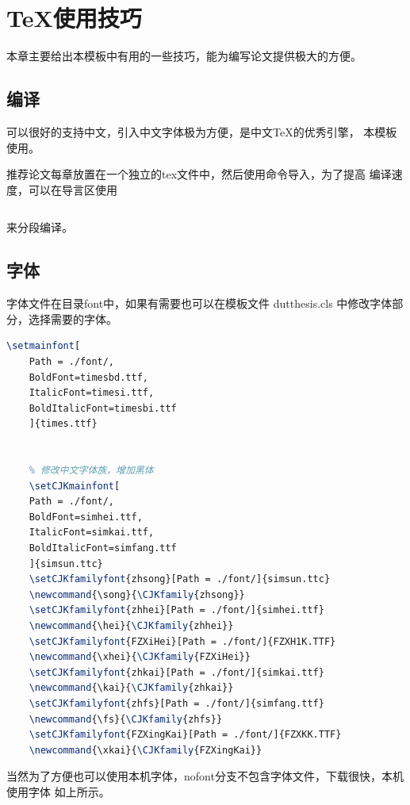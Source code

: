 \chapter{\TeX 使用技巧}
\begin{Sketch}
    本章主要给出本模板中有用的一些技巧，能为编写论文提供极大的方便。
\end{Sketch}
\section{编译}
\label{sec:compile}
    \XeLaTeX 可以很好的支持中文，引入中文字体极为方便，是中文\TeX 的优秀引擎，
    本模板使用\XeLaTeX 。

推荐论文每章放置在一个独立的tex文件中，然后使用\verb||命令导入，为了提高
编译速度，可以在导言区使用 
\begin{lstlisting}

\end{lstlisting}
来分段编译。

\section{字体}
\label{sec:font}
    字体文件在目录font中，如果有需要也可以在模板文件
    dutthesis.cls 中修改字体部分，选择需要的字体。
    \begin{lstlisting}[language=TeX]
	\setmainfont[
	Path = ./font/,
	BoldFont=timesbd.ttf,
	ItalicFont=timesi.ttf,
	BoldItalicFont=timesbi.ttf
	]{times.ttf}


	% 修改中文字体族，增加黑体
	\setCJKmainfont[
	Path = ./font/,
	BoldFont=simhei.ttf,
	ItalicFont=simkai.ttf,
	BoldItalicFont=simfang.ttf
	]{simsun.ttc}
	\setCJKfamilyfont{zhsong}[Path = ./font/]{simsun.ttc}
	\newcommand{\song}{\CJKfamily{zhsong}}
	\setCJKfamilyfont{zhhei}[Path = ./font/]{simhei.ttf}
	\newcommand{\hei}{\CJKfamily{zhhei}}
	\setCJKfamilyfont{FZXiHei}[Path = ./font/]{FZXH1K.TTF}
	\newcommand{\xhei}{\CJKfamily{FZXiHei}}
	\setCJKfamilyfont{zhkai}[Path = ./font/]{simkai.ttf}
	\newcommand{\kai}{\CJKfamily{zhkai}}
	\setCJKfamilyfont{zhfs}[Path = ./font/]{simfang.ttf}
	\newcommand{\fs}{\CJKfamily{zhfs}}
	\setCJKfamilyfont{FZXingKai}[Path = ./font/]{FZXKK.TTF}
	\newcommand{\xkai}{\CJKfamily{FZXingKai}}
    \end{lstlisting}
当然为了方便也可以使用本机字体，nofont分支不包含字体文件，下载很快，本机使用字体
如上所示。



